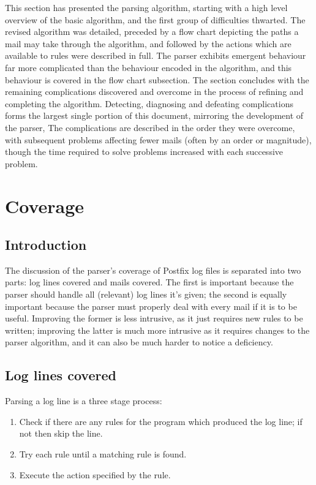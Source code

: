 \documentclass[a4paper,12pt,draft]{article}
\begin{document}
This section has presented the parsing algorithm, starting with a high
level overview of the basic algorithm, and the first group of difficulties
thwarted.  The revised algorithm was detailed, preceded by a flow chart
depicting the paths a mail may take through the algorithm, and followed by
the actions which are available to rules were described in full.  The
parser exhibits emergent behaviour far more complicated than the behaviour
encoded in the algorithm, and this behaviour is covered in the flow chart
subsection.  The section concludes with the remaining complications
discovered and overcome in the process of refining and completing the
algorithm.  Detecting, diagnosing and defeating complications forms the
largest single portion of this document, mirroring the development of the
parser,  The complications are described in the order they were overcome,
with subsequent problems affecting fewer mails (often by an order or
magnitude), though the time required to solve problems increased with each
successive problem.

\section{Coverage}

\label{parsing coverage}

\subsection{Introduction}

The discussion of the parser's coverage of Postfix log files is separated
into two parts: log lines covered and mails covered.  The first is
important because the parser should handle all (relevant) log lines it's
given; the second is equally important because the parser must properly
deal with every mail if it is to be useful.  Improving the former is
less intrusive, as it just requires new rules to be written; improving the
latter is much more intrusive as it requires changes to the parser
algorithm, and it can also be much harder to notice a deficiency.

\subsection{Log lines covered}

\label{log-lines-covered}

Parsing a log line is a three stage process:

\begin{enumerate}

    \item Check if there are any rules for the program which produced the
        log line; if not then skip the line.

    \item Try each rule until a matching rule is found.

    \item Execute the action specified by the rule.

\end{enumerate}
\end{document}
